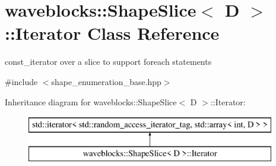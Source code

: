 \hypertarget{classwaveblocks_1_1_shape_slice_1_1_iterator}{}\section{waveblocks\+:\+:Shape\+Slice$<$ D $>$\+:\+:Iterator Class Reference}
\label{classwaveblocks_1_1_shape_slice_1_1_iterator}


const\+\_\+iterator over a slice to support foreach statements  




{\ttfamily \#include $<$shape\+\_\+enumeration\+\_\+base.\+hpp$>$}

Inheritance diagram for waveblocks\+:\+:Shape\+Slice$<$ D $>$\+:\+:Iterator\+:\begin{figure}[H]
\begin{center}
\leavevmode
\includegraphics[height=2.000000cm]{classwaveblocks_1_1_shape_slice_1_1_iterator}
\end{center}
\end{figure}
